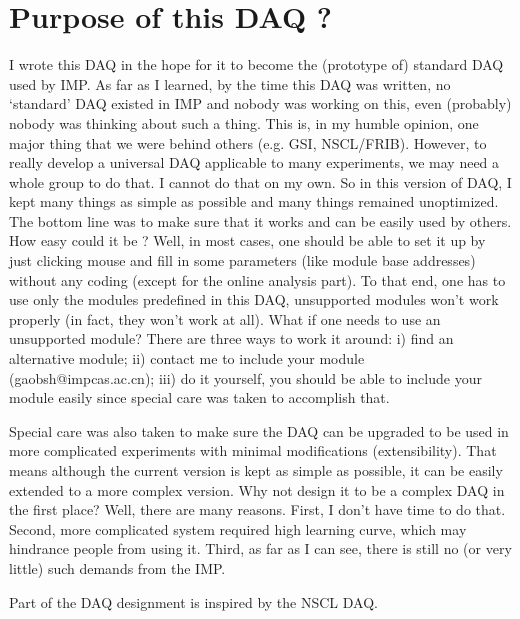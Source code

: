 \documentclass[a4paper,12pt]{article}
\begin{document}
	\section{Purpose of this DAQ ?}
	I wrote this DAQ in the hope for it to become the (prototype of)
	standard DAQ used by IMP. As far as I learned, by the time this DAQ was
	written, no `standard' DAQ existed in IMP and nobody was working on
	this, even (probably) nobody was thinking about such a thing. This is,
	in my humble opinion, one major thing that we were behind others (e.g.
	GSI, NSCL/FRIB). However, to really develop a universal DAQ applicable
	to many experiments, we may need a whole group to do that. I cannot do
	that on my own. So in this version of DAQ, I kept many things as simple
	as possible and many things remained unoptimized. The bottom line was to
	make sure that it works and can be easily used by others. How easy could
	it be ? Well, in most cases, one should be able to set it up by just
	clicking mouse and fill in some parameters (like module base addresses)
	without any coding (except for the online analysis part). To that end,
	one has to use only the modules predefined in this DAQ, unsupported
	modules won't work properly (in fact, they won't work at all). What if
	one needs to use an unsupported module? There are three ways to work it
	around: i) find an alternative module; ii) contact me to include your
	module (gaobsh@impcas.ac.cn); iii) do it yourself, you should be able to
	include your module easily since special care was taken to accomplish
	that.

	Special care was also taken to make sure the DAQ can be
	upgraded to be used in more complicated experiments with minimal
	modifications (extensibility). That means although the current version
	is kept as simple as possible, it can be easily extended to a more
	complex version. Why not design it to be a complex DAQ in the first
	place? Well, there are many reasons. First, I don't have time to do
	that. Second, more complicated system required high learning curve,
	which may hindrance people from using it. Third, as far as I can see,
	there is still no (or very little) such demands from the IMP.

	Part of the DAQ designment is inspired by the NSCL DAQ.
\end{document}
